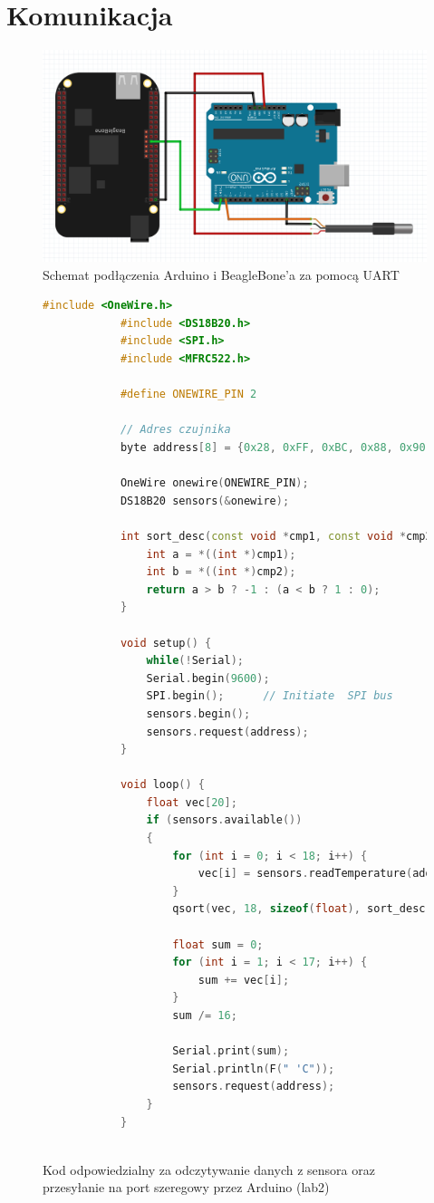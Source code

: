 \documentclass[polish,a4paper]{article}
\begin{document}
	\section{Komunikacja}
	\begin{figure}[h!]
		\begin{center}
			\includegraphics[scale=0.55]{UART.png}
			\caption*{Schemat podłączenia Arduino i BeagleBone'a za pomocą UART}
		\end{center}
	\end{figure}
	\newpage
	\begin{figure}[h!]
		\begin{lstlisting}[language=C++]
			#include <OneWire.h>
			#include <DS18B20.h>
			#include <SPI.h>
			#include <MFRC522.h>
			
			#define ONEWIRE_PIN 2
			
			// Adres czujnika
			byte address[8] = {0x28, 0xFF, 0xBC, 0x88, 0x90, 0x17, 0x5, 0x76};
			
			OneWire onewire(ONEWIRE_PIN);
			DS18B20 sensors(&onewire);
			
			int sort_desc(const void *cmp1, const void *cmp2){
				int a = *((int *)cmp1);
				int b = *((int *)cmp2);
				return a > b ? -1 : (a < b ? 1 : 0);
			}
			
			void setup() {
				while(!Serial);
				Serial.begin(9600);
				SPI.begin();      // Initiate  SPI bus
				sensors.begin();
				sensors.request(address);
			}
			
			void loop() {
				float vec[20];
				if (sensors.available())
				{
					for (int i = 0; i < 18; i++) {
						vec[i] = sensors.readTemperature(address);
					}
					qsort(vec, 18, sizeof(float), sort_desc);
					
					float sum = 0;
					for (int i = 1; i < 17; i++) {
						sum += vec[i];
					}
					sum /= 16;
					
					Serial.print(sum);
					Serial.println(F(" 'C"));
					sensors.request(address);
				}
			}
			
		\end{lstlisting}
		\caption*{Kod odpowiedzialny za odczytywanie danych z sensora oraz przesyłanie na port szeregowy przez Arduino (lab2)}
	\end{figure}
	
\end{document}
